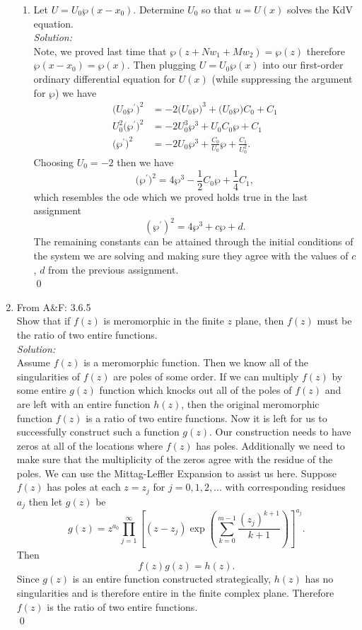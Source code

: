 \documentclass[10pt]{amsart}
\theoremstyle{nonumberplain}
\begin{document}
\begin{enumerate}[label={\bf {\arabic*}:}]
\begin{enumerate}
\item Let $U=U_0 \wp\left(x-x_0\right)$. Determine $U_0$ so that $u=U(x)$ solves the KdV equation.\\

\noindent
\textit{Solution:} \\
Note, we proved last time that $\wp(z + N w_1 + M w_2) = \wp(z)$ therefore $\wp(x - x_0) = \wp(x)$.
Then plugging $U=U_0 \wp(x)$ into our first-order ordinary differential equation for $U(x)$ (while suppressing the argument for $\wp$) we have
\begin{align*}
\big(U_0 \wp^\prime\big)^2 &=  - 2 \big(U_0 \wp\big)^3 + \big(U_0 \wp\big)C_0 + C_1 \\
U_0^2 \big(\wp^\prime\big)^2 &= -2 U_0^3 \wp^3 + U_0 C_0 \wp + C_1 \\
\big(\wp^\prime\big)^2 &= -2 U_0 \wp^3 + \frac {C_0} {U_0} \wp + \frac {C_1} {U_0^2}.
\end{align*}
Choosing $U_0 = -2$ then we have
$$
\big(\wp^\prime\big)^2 = 4 \wp^3 -\frac 1 2 C_0 \wp + \frac 1 4 C_1,
$$
which resembles the ode which we proved holds true in the last assignment
$$
(\wp^\prime)^2 = 4\wp^3 + c \wp + d.
$$
The remaining constants can be attained through the initial conditions of the system we are solving and making sure they agree with the values of $c$, $d$ from the previous assignment. \\
\qed \\
\end{enumerate}
\newpage

\item From A\&F: 3.6.5\\
Show that if $f (z)$ is meromorphic in the finite $z$ plane, then $f (z)$ must be
the ratio of two entire functions. \\

\noindent
\textit{Solution:} \\
Assume $f(z)$ is a meromorphic function.
Then we know all of the singularities of $f(z)$ are poles of some order.
If we can multiply $f(z)$ by some entire $g(z)$ function which knocks out all of the poles of $f(z)$ and are left with an entire function $h(z)$, then the original meromorphic function $f(z)$ is a ratio of two entire functions.
Now it is left for us to successfully construct such a function $g(z)$.
Our construction needs to have zeros at all of the locations where $f(z)$ has poles.
Additionally we need to make sure that the multiplicity of the zeros agree with the residue of the poles.
We can use the Mittag-Leffler Expansion to assist us here.
Suppose $f(z)$ has poles at each $z = z_j$ for $j = 0, 1, 2, ...$ with corresponding residues $a_j$ then let $g(z)$ be
$$
g(z) = z^{a_0} \prod_{j=1}^\infty \left[ (z - z_j) \exp\left(\sum_{k=0}^{m-1}\frac{(z_j)^{k + 1}}{k + 1}\right) \right]^{a_j}.
$$
Then
$$
f(z)g(z) = h(z).
$$
Since $g(z)$ is an entire function constructed strategically, $h(z)$ has no singularities and is therefore entire in the finite complex plane.
Therefore $f(z)$ is the ratio of two entire functions. \\
\qed


\end{enumerate}
\end{document}
